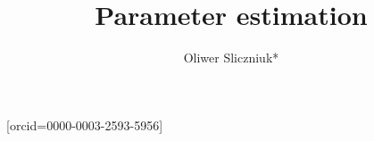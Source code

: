 \documentclass[a4paper,fleqn]{cas-dc}
\begin{document}
 

\title[mode=title]{Parameter estimation}                      


\author[1]{Oliwer Sliczniuk*}[orcid=0000-0003-2593-5956]
\cormark[1]



\address[1]{Aalto University, School of Chemical Engineering, Espoo, 02150, Finland}

\end{document}
